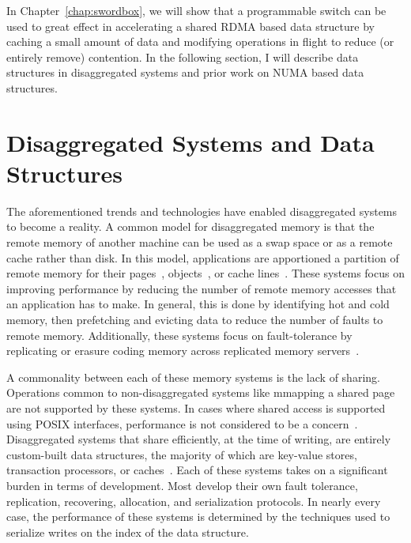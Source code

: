 \documentclass[12pt]{ucsddissertation}
\begin{document}
In Chapter~\ref{chap:swordbox}, we will show that a programmable switch can be used to great effect
in accelerating a shared RDMA based data structure by caching a small amount of data and modifying
operations in flight to reduce (or entirely remove) contention. In the following section, I will
describe data structures in disaggregated systems and prior work on NUMA based data structures.




\section{Disaggregated Systems and Data Structures}
\label{sec:disaggregated-data-structures}


The aforementioned trends and technologies have enabled disaggregated systems to become a reality. A
common model for disaggregated memory is that the remote memory of another machine can be used as a
swap space or as a remote cache rather than disk. In this model, applications are apportioned a
partition of remote memory for their
pages~\cite{infiniswap,fastswap,leap,blade-server,legoos,hydra}, objects~\cite{aifm,carbink}, or
cache lines~\cite{kona}. These systems focus on improving performance by reducing the number of
remote memory accesses that an application has to make. In general, this is done by identifying hot
and cold memory, then prefetching and evicting data to reduce the number of faults to remote memory.
Additionally, these systems focus on fault-tolerance by replicating or erasure coding memory across
replicated memory servers~\cite{hydra}.

A commonality between each of these memory systems is the lack of sharing. Operations common to
non-disaggregated systems like mmapping a shared page are not supported by these systems. In cases
where shared access is supported using POSIX interfaces, performance is not considered to be a
concern~\cite{regions}. Disaggregated systems that share efficiently, at the time of writing, are
entirely custom-built data structures, the majority of which are key-value stores, transaction
processors, or caches~\cite{clover, sherman, race, fusee, rolex, ford, ditto}. Each of these systems
takes on a significant burden in terms of development. Most develop their own fault tolerance,
replication, recovering, allocation, and serialization protocols. In nearly every case, the
performance of these systems is determined by the techniques used to serialize writes on the index
of the data structure.
\end{document}
